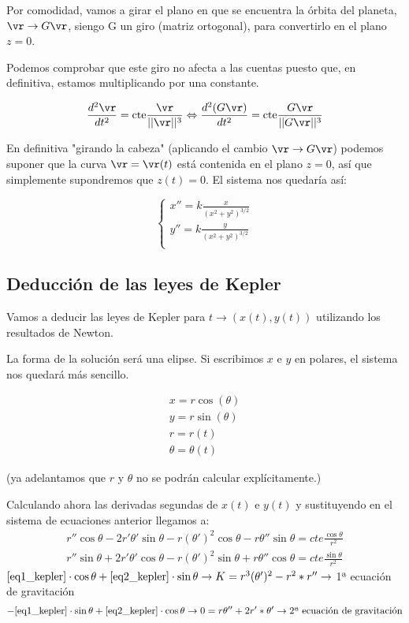 Por comodidad, vamos a girar el plano en que se encuentra la órbita del planeta, $\vr \rightarrow G\vr$, siengo G un giro (matriz ortogonal), para convertirlo en el plano $z=0$.

Podemos comprobar que este giro no afecta a las cuentas puesto que, en definitiva, estamos multiplicando por una constante.

$$\frac{d^2\vr}{dt^2} = \text{cte}\frac{\vr}{||\vr||^3} \Leftrightarrow \frac{d^2(G\vr)}{dt^2} = \text{cte}\frac{G\vr}{||G\vr||^3}$$

En definitiva "girando la cabeza" (aplicando el cambio $\vr \rightarrow G\vr$) podemos suponer que la curva $\vr = \vr(t)$ está contenida en el plano $z = 0$, así que simplemente supondremos que $z(t) = 0$. El sistema nos quedaría así:


$$
\begin{cases}
 x'' = k\frac{x}{(x^2 + y^2)^{3/2}}\\
 y'' = k\frac{y}{(x^2 + y^2)^{3/2}}\\
\end{cases}
$$

\subsection{Deducción de las leyes de Kepler}

Vamos a deducir las leyes de Kepler para $t \rightarrow (x(t), y(t))$ utilizando los resultados de Newton.

La forma de la solución será una elipse.
Si escribimos $x$ e $y$ en polares, el sistema nos quedará más sencillo.

$$\begin{array}{c}
x = r\cos(\theta)\\
y = r\sin(\theta) \\
r = r(t) \\
\theta = \theta(t)
\end{array}
$$

(ya adelantamos que $r$ y $\theta$ no se podrán calcular explícitamente.)

Calculando ahora las derivadas segundas de $x(t)$ e $y(t)$ y sustituyendo en el sistema de ecuaciones anterior llegamos a:
\begin{gather}
r''\cos\theta - 2r'\theta'\sin\theta - r(\theta')^2\cos\theta - r\theta''\sin\theta = cte \frac{\cos\theta}{r^2} \label{eq1_kepler}\\
r''\sin\theta + 2r'\theta'\cos\theta - r(\theta')^2\sin\theta + r\theta''\cos\theta = cte \frac{\sin\theta}{r^2} \label{eq2_kepler}
\end{gather}
$\eqref{eq1_kepler}\cdot\cos\theta + \eqref{eq2_kepler}\cdot\sin\theta \rightarrow K= r^3(\theta')^2 - r^2*r'' \rightarrow$ 1ª ecuación de gravitación
$$-\eqref{eq1_kepler}\cdot\sin\theta + \eqref{eq2_kepler}\cdot\cos\theta \rightarrow 0= r \theta'' + 2r' * \theta' \rightarrow \text{2ª ecuación de gravitación}$$


